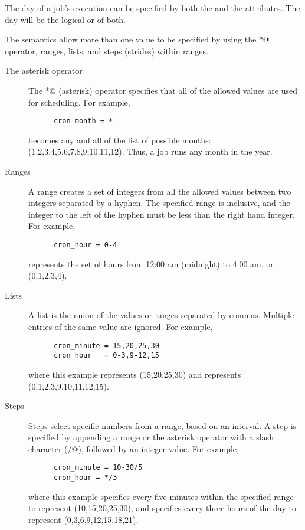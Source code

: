 The day of a job's execution can be specified 
by both the  
and the  attributes. 
The day will be the logical or of both.

The semantics allow more than one value to be specified 
by using the \verb@*@ operator,
ranges, lists, and steps (strides) within ranges.

\begin{description}
   \item[The asterisk operator]
   The \verb@*@ (asterisk) operator specifies that all of the 
   allowed values are used for scheduling.
   For example,
   \begin{verbatim}
      cron_month = *
   \end{verbatim}
   becomes any and all of the list of possible months:
   (1,2,3,4,5,6,7,8,9,10,11,12).
   Thus, a job runs any month in the year.

   \item[Ranges]
   A range creates a set of integers from all the allowed values between two
   integers separated by a hyphen. The specified range is inclusive, and the
   integer to the left of the hyphen must be less than the right hand integer.
   For example,
   \begin{verbatim}
      cron_hour = 0-4
   \end{verbatim}
   represents the set of
   hours from 12:00 am (midnight) to 4:00 am, or (0,1,2,3,4).
   
   \item[Lists]
   A list is the union of the values or ranges separated by commas. Multiple
   entries of the same value are ignored. 
   For example,
   \begin{verbatim}
      cron_minute = 15,20,25,30
      cron_hour   = 0-3,9-12,15
   \end{verbatim}
   where this  example represents (15,20,25,30)
   and  represents (0,1,2,3,9,10,11,12,15).
      
   \item[Steps]
   Steps select specific numbers from a range, based on an interval.
   A step is specified by appending a range or the asterisk
   operator with a slash character (\verb@/@),
   followed by an integer value.
   For example,
   \begin{verbatim}
      cron_minute = 10-30/5
      cron_hour = */3
   \end{verbatim}
   where this  example specifies
   every five minutes within the specified range 
   to represent (10,15,20,25,30),
   and  specifies every three hours of the day
   to represent (0,3,6,9,12,15,18,21).
   

\end{description}


